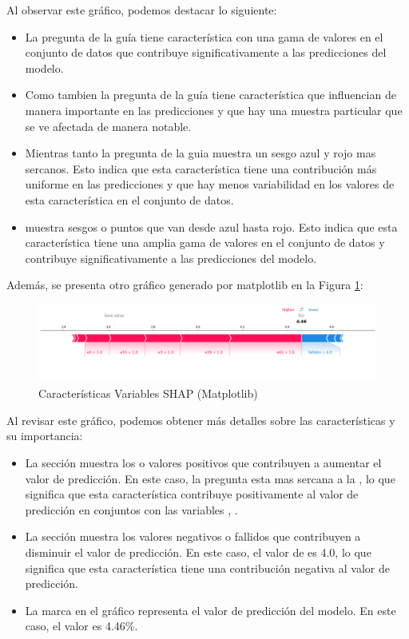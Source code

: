 Al observar este gráfico, podemos destacar lo siguiente:

\begin{itemize}
    \item La pregunta de la guía  tiene característica con una gama de valores en el conjunto de datos que contribuye significativamente a las predicciones del modelo.
    \item Como tambien la pregunta de la guía  tiene característica que influencian de manera importante en las predicciones y que hay una muestra particular que se ve afectada de manera notable.
    \item Mientras tanto la pregunta de la guia  muestra un sesgo azul y rojo mas sercanos. Esto indica que esta característica tiene una contribución más uniforme en las predicciones y que hay menos variabilidad en los valores de esta característica en el conjunto de datos.
    \item {} muestra sesgos o puntos que van desde azul hasta rojo. Esto indica que esta característica tiene una amplia gama de valores en el conjunto de datos y contribuye significativamente a las predicciones del modelo.
\end{itemize}

Además, se presenta otro gráfico generado por matplotlib en la Figura \ref{fig:caract_var_shap_mat_lr2}:

\begin{figure}[H]
    \centering
    \includegraphics[width=1\textwidth]{img/shap_lr/shapForcePlot_lr2.png}
    \caption{Características Variables SHAP (Matplotlib)}
    \label{fig:caract_var_shap_mat_lr2}
\end{figure}

Al revisar este gráfico, podemos obtener más detalles sobre las características y su importancia:

\begin{itemize}
    \item La sección  muestra los  o valores positivos que contribuyen a aumentar el valor de predicción. En este caso, la pregunta  esta mas sercana a la , lo que significa que esta característica contribuye positivamente al valor de predicción en conjuntos con las variables , .
    \item La sección  muestra los valores negativos o fallidos que contribuyen a disminuir el valor de predicción. En este caso, el valor de  es 4.0, lo que significa que esta característica tiene una contribución negativa al valor de predicción.
    \item La marca  en el gráfico representa el valor de predicción del modelo. En este caso, el valor es 4.46\%.
\end{itemize}



